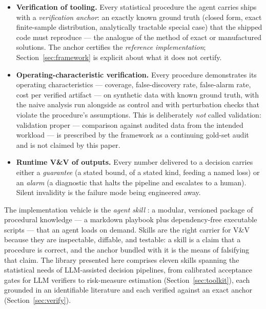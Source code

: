 \documentclass[11pt,a4paper]{article}
\begin{document}
\begin{itemize}[leftmargin=1.6em]
\item \textbf{Verification of tooling.} Every statistical procedure the
agent carries ships with a \emph{verification anchor}: an exactly known
ground truth (closed form, exact finite-sample distribution, analytically
tractable special case) that the shipped code must reproduce --- the
analogue of the method of exact or manufactured solutions. The anchor
certifies the \emph{reference implementation}; Section~\ref{sec:framework}
is explicit about what it does not certify.
\item \textbf{Operating-characteristic verification.} Every procedure
demonstrates its operating characteristics --- coverage, false-discovery
rate, false-alarm rate, cost per verified artifact --- on synthetic data
with known ground truth, with the naive analysis run alongside as control
and with perturbation checks that violate the procedure's assumptions.
This is deliberately \emph{not} called validation: validation proper ---
comparison against audited data from the intended workload --- is
prescribed by the framework as a continuing gold-set audit and is not
claimed by this paper.
\item \textbf{Runtime V\&V of outputs.} Every number delivered to a
decision carries either a \emph{guarantee} (a stated bound, of a stated
kind, feeding a named loss) or an \emph{alarm} (a diagnostic that halts
the pipeline and escalates to a human). Silent invalidity is the failure
mode being engineered away.
\end{itemize}

The implementation vehicle is the \emph{agent skill}
\citep{anthropic2025skills}: a modular, versioned package of procedural
knowledge --- a markdown playbook plus dependency-free executable scripts
--- that an agent loads on demand. Skills are the right carrier for V\&V
because they are inspectable, diffable, and testable: a skill is a claim
that a procedure is correct, and the anchor bundled with it is the means of
falsifying that claim. The library presented here comprises eleven skills
spanning the statistical needs of LLM-assisted decision pipelines, from
calibrated acceptance gates for LLM verifiers to risk-measure estimation
(Section~\ref{sec:toolkit}), each grounded in an identifiable literature
and each verified against an exact anchor
(Section~\ref{sec:verify}).
\end{document}

